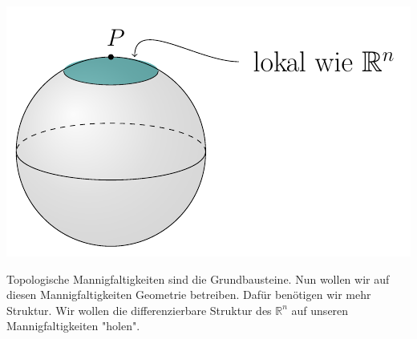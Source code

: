 \hspace{1cm}
\begin{minipage}[H]{.2\textwidth}
\vspace{-0.5cm}
\includegraphics[scale=0.5]{figures/tikz/sphere_local_rn}
\end{minipage}


Topologische Mannigfaltigkeiten sind die Grundbausteine. Nun wollen wir auf diesen Mannigfaltigkeiten Geometrie betreiben. Dafür benötigen wir mehr Struktur. Wir wollen die differenzierbare Struktur des $\mathbb{R}^n$ auf unseren Mannigfaltigkeiten "holen".


